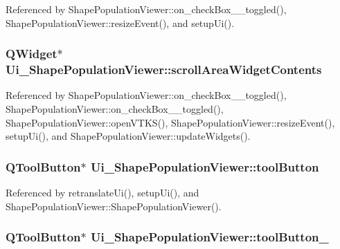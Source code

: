 Referenced by Shape\-Population\-Viewer\-::on\-\_\-check\-Box\-\_\-\_\-toggled(), Shape\-Population\-Viewer\-::resize\-Event(), and setup\-Ui().

\hypertarget{class_ui___shape_population_viewer_ad4285cc74892781f0419c5efa53a4663}{
\subsubsection[{scroll\-Area\-Widget\-Contents}]{\setlength{\rightskip}{0pt plus 5cm}Q\-Widget$\ast$ Ui\-\_\-\-Shape\-Population\-Viewer\-::scroll\-Area\-Widget\-Contents}}\label{class_ui___shape_population_viewer_ad4285cc74892781f0419c5efa53a4663}


Referenced by Shape\-Population\-Viewer\-::on\-\_\-check\-Box\-\_\-\_\-toggled(), Shape\-Population\-Viewer\-::on\-\_\-check\-Box\-\_\-\_\-toggled(), Shape\-Population\-Viewer\-::open\-V\-T\-K\-S(), Shape\-Population\-Viewer\-::resize\-Event(), setup\-Ui(), and Shape\-Population\-Viewer\-::update\-Widgets().

\hypertarget{class_ui___shape_population_viewer_ae80dc998f4b58c43777c43cf5b2869a0}{
\subsubsection[{tool\-Button}]{\setlength{\rightskip}{0pt plus 5cm}Q\-Tool\-Button$\ast$ Ui\-\_\-\-Shape\-Population\-Viewer\-::tool\-Button}}\label{class_ui___shape_population_viewer_ae80dc998f4b58c43777c43cf5b2869a0}


Referenced by retranslate\-Ui(), setup\-Ui(), and Shape\-Population\-Viewer\-::\-Shape\-Population\-Viewer().

\hypertarget{class_ui___shape_population_viewer_a933f45c6629c5235a40cb5f5c5baaf88}{
\subsubsection[{tool\-Button\-\_\-2}]{\setlength{\rightskip}{0pt plus 5cm}Q\-Tool\-Button$\ast$ Ui\-\_\-\-Shape\-Population\-Viewer\-::tool\-Button\-\_}}\label{class_ui___shape_population_viewer_a933f45c6629c5235a40cb5f5c5baaf88}


